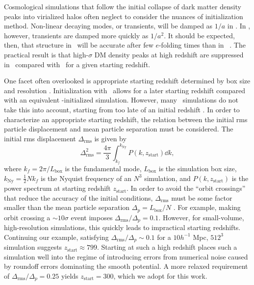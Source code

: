 
Cosmological simulations that follow the initial collapse of dark matter density peaks into virialized halos often neglect to consider the nuances of initialization method.  Non-linear decaying modes, or transients, will be damped as $1 / a$ in \za.  In \lpt, however, transients are damped more quickly as $1 / a^{2}$.  It should be expected, then, that structure in \lpt\ will be accurate after few $e$-folding times than in \za\ \citep{1998MNRAS.299.1097S, 2006MNRAS.373..369C, 2010MNRAS.403.1859J}.  The practical result is that high-$\sigma$ DM density peaks at high redshift are suppressed in \za\ compared with \lpt\ for a given starting redshift.

One facet often overlooked is appropriate starting redshift determined by box size and resolution \citep{2007ApJ...671.1160L}.  Initialization with \lpt\ allows for a later starting redshift compared with an equivalent \za-initialized simulation.  However, many \za\ simulations do not take this into account, starting from too late of an initial redshift \citep{2006MNRAS.373..369C, 2010MNRAS.403.1859J}.  In order to characterize an appropriate starting redshift, the relation between the initial rms particle displacement and mean particle separation must be considered.  The initial rms displacement $\Delta_{\mathrm{rms}}$ is given by
\begin{equation}
	\Delta_{\mathrm{rms}}^{2} = \frac{4 \pi}{3} \int_{k_{f}}^{k_{\mathrm{Ny}}} P(k, z_{\mathrm{start}}) \dd k,
\end{equation}
where $k_{f} = 2 \pi / L_{\mathrm{box}}$ is the fundamental mode, $L_{\mathrm{box}}$ is the simulation box size, $k_{\mathrm{Ny}} = \frac{1}{2} N k_{f}$ is the Nyquist frequency of an $N^{3}$ simulation, and $P(k, z_{\mathrm{start}})$ is the power spectrum at starting redshift $z_{\mathrm{start}}$.  In order to avoid the ``orbit crossings'' that reduce the accuracy of the initial conditions, $\Delta_{\mathrm{rms}}$ must be some factor smaller than the mean particle separation $\Delta_{p} = L_{\mathrm{box}} / N$ \citep{2012ApJ...761L...8H}.  For example, making orbit crossing a $\sim 10 \sigma$ event imposes $\Delta_{\mathrm{rms}} / \Delta_{p} = 0.1$.  However, for small-volume, high-resolution simulations, this quickly leads to impractical starting redshifts.  Continuing our example, satisfying $\Delta_{\mathrm{rms}} / \Delta_{p} \sim 0.1$ for a $10 h^{-1}$ Mpc, $512^{3}$ simulation suggests $z_{\mathrm{start}} \approx 799$.  Starting at such a high redshift places such a simulation well into the regime of introducing errors from numerical noise caused by roundoff errors dominating the smooth potential.  A more relaxed requirement of $\Delta_{\mathrm{rms}} / \Delta_{p} = 0.25$ yields $z_{\mathrm{start}} = 300$, which we adopt for this work.

